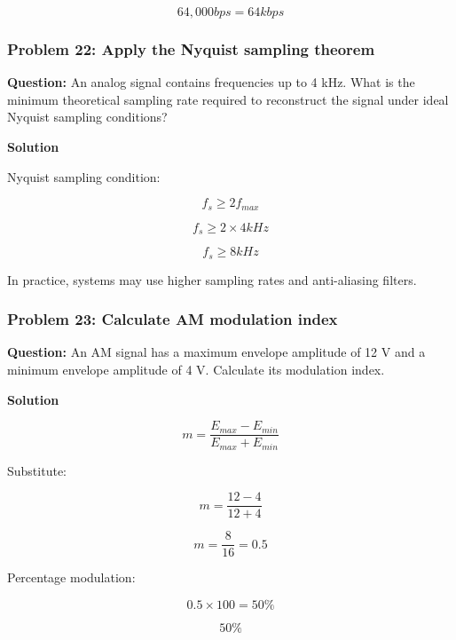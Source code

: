 \[
\boxed{64,000bps=64kbps}
\]



\subsubsection*{Problem 22: Apply the Nyquist sampling theorem}

\textbf{Question:} An analog signal contains frequencies up to 4 kHz. What is the minimum theoretical sampling rate required to reconstruct the signal under ideal Nyquist sampling conditions?

\textbf{Solution}

Nyquist sampling condition:



\[
f_s\geq2f_{max}
\]





\[
f_s\geq2\times4kHz
\]





\[
\boxed{f_s\geq8kHz}
\]



In practice, systems may use higher sampling rates and anti-aliasing filters.

\subsubsection*{Problem 23: Calculate AM modulation index}

\textbf{Question:} An AM signal has a maximum envelope amplitude of 12 V and a minimum envelope amplitude of 4 V. Calculate its modulation index.

\textbf{Solution}



\[
m=\frac{E_{max}-E_{min}}{E_{max}+E_{min}}
\]



Substitute:



\[
m=\frac{12-4}{12+4}
\]





\[
m=\frac{8}{16}=0.5
\]



Percentage modulation:



\[
0.5\times100=50\%
\]





\[
\boxed{50\%}
\]



